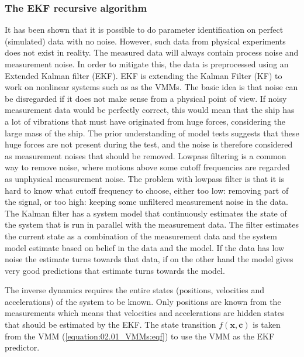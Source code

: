 \documentclass[review]{elsarticle}
\begin{document}
\subsubsection{The EKF recursive algorithm}
\label{\detokenize{04.01_EK:the-ekf-recursive-algorithm}}
\sphinxAtStartPar
It has been shown that it is possible to do parameter identification on perfect (simulated) data with no noise. However, such data from physical experiments does not exist in reality. The measured data will always contain process noise and measurement noise. In order to mitigate this, the data is pre\sphinxhyphen{}processed using an Extended Kalman filter (EKF). EKF  is extending the Kalman Filter (KF) to work on nonlinear systems such as as the VMMs. The basic idea is that noise can be disregarded if it does not make sense from a physical point of view. If noisy measurement data would be perfectly correct, this would mean that the ship has a lot of vibrations that must have originated from huge forces, considering the large mass of the ship. The prior understanding of model tests suggests that these huge forces are not present during the test, and the noise is therefore considered as measurement noises that should be removed. Low\sphinxhyphen{}pass filtering is a common way to remove noise, where motions above some cut\sphinxhyphen{}off frequencies are regarded as unphysical measurement noise. The problem with low\sphinxhyphen{}pass filter is that it is hard to know what cut\sphinxhyphen{}off frequency to choose, either too low: removing part of the signal, or too high: keeping some unfiltered measurement noise in the data. The Kalman filter has a system model that continuously estimates the state of the system that is run in parallel with the measurement data. The filter estimates the current state as a combination of the measurement data and the system model estimate based on belief in the data and the model. If the data has low noise the estimate turns towards that data, if on the other hand the model gives very good predictions that estimate turns towards the model.

\sphinxAtStartPar
The inverse dynamics requires the entire states (positions, velocities and accelerations) of the system to be known. Only positions are known from the measurements which means that velocities and accelerations are hidden states that should be estimated by the EKF.
The state transition \(f(\mathbf{x},\mathbf{c})\) is taken from the VMM (\autoref{equation:02.01_VMMs:eqf}) to use the VMM as the EKF predictor.
\end{document}
